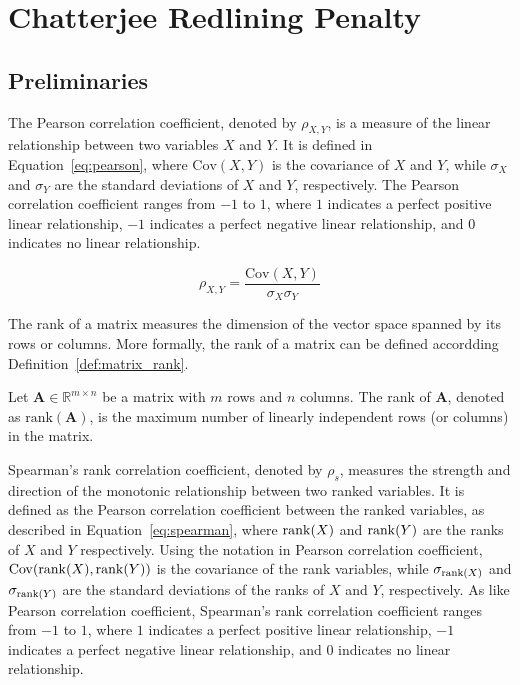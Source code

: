 \chapter{Chatterjee Redlining Penalty}

\section{Preliminaries}

The Pearson correlation coefficient, denoted by $\rho_{X,Y}$, is a measure of the linear relationship between two variables $X$ and $Y$. It is defined in Equation~\ref{eq:pearson}, where $\mathrm{Cov}(X, Y)$ is the covariance of $X$ and $Y$, while $\sigma_X$ and $\sigma_Y$ are the standard deviations of $X$ and $Y$, respectively. The Pearson correlation coefficient ranges from $-1$ to $1$, where $1$ indicates a perfect positive linear relationship, $-1$ indicates a perfect negative linear relationship, and $0$ indicates no linear relationship.

\begin{equation}\label{eq:pearson}
\rho_{X,Y} = \frac{\mathrm{Cov}(X, Y)}{\sigma_X \sigma_Y}
\end{equation}

The rank of a matrix measures the dimension of the vector space spanned by its rows or columns. More formally, the rank of a matrix can be defined accordding Definition~\ref{def:matrix_rank}.

\begin{definition} \label{def:matrix_rank}
Let $\mathbf{A} \in \mathbb{R}^{m \times n}$ be a matrix with $m$ rows and $n$ columns. The rank of $\mathbf{A}$, denoted as $\text{rank}(\mathbf{A})$, is the maximum number of linearly independent rows (or columns) in the matrix.
\end{definition}

Spearman's rank correlation coefficient, denoted by $\rho_s$, measures the strength and direction of the monotonic relationship between two ranked variables. It is defined as the Pearson correlation coefficient between the ranked variables, as described in Equation~\ref{eq:spearman}, where $\operatorname{rank}(X)$ and $\operatorname{rank}(Y)$ are the ranks of $X$ and $Y$ respectively. Using the notation in Pearson correlation coefficient, $\mathrm{Cov}(\operatorname{rank}(X), \operatorname{rank}(Y))$ is the covariance of the rank variables, while $\sigma_{\operatorname{rank}(X)}$ and $\sigma_{\operatorname{rank}(Y)}$ are the standard deviations of the ranks of $X$ and $Y$, respectively. As like Pearson correlation coefficient, Spearman's rank correlation coefficient ranges from $-1$ to $1$, where $1$ indicates a perfect positive linear relationship, $-1$ indicates a perfect negative linear relationship, and $0$ indicates no linear relationship.

